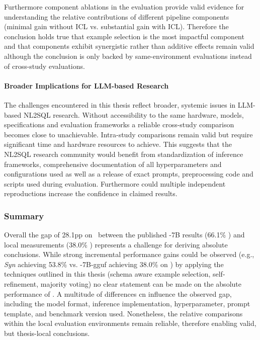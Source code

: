 Furthermore component ablations in the evaluation provide valid evidence for
understanding the relative contributions of different pipeline components
(minimal gain without ICL vs. substantial gain with ICL). Therefore the
conclusion holds true that example selection is the most impactful component
and that components exhibit synergistic rather than additive effects remain
valid although the conclusion is only backed by same-environment evaluations
instead of cross-study evaluations.

\paragraph{Broader Implications for LLM-based Research}

The challenges encountered in this thesis reflect broader, systemic issues in
LLM-based NL2SQL research. Without accessibility to the same hardware, models,
specifications and evaluation frameworks a reliable cross-study comparison
becomes close to unachievable. Intra-study comparisons remain valid but require
significant time and hardware resources to achieve. This suggests that the
NL2SQL research community would benefit from standardization of inference
frameworks, comprehensive documentation of all hyperparameters and
configurations used as well as a release of exact prompts, preprocessing code
and scripts used during evaluation. Furthermore could multiple independent
reproductions increase the confidence in claimed results. 

\subsubsection{Summary}

Overall the gap of 28.1pp on \Bird~between the published \OmniSQL-7B results
(66.1\% \EA) and local measurements (38.0\% \EA) represents a challenge for
deriving absolute conclusions. While strong incremental performance gains could
be observed (e.g., \textit{Syn} achieving 53.8\% vs. \OmniSQL-7B-gguf achieving
38.0\% on \Bird) by applying the techniques outlined in this thesis (schema
aware example selection, self-refinement, majority voting) no clear statement
can be made on the absolute performance of \Natural. A multitude of differences
cn influence the observed gap, including the model format, inference
implementation, hyperparameter, prompt template, and benchmark version used.
Nonetheless, the relative comparisons within the local evaluation environments
remain reliable, therefore enabling valid, but thesis-local conclusions.

